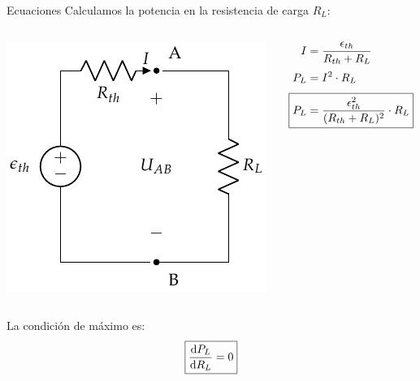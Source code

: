 \documentclass[aspectratio=169, xcolor={usenames,svgnames,dvipsnames}]{beamer}
\begin{document}
\begin{frame}{Ecuaciones}
    \vspace{2mm}
    Calculamos la \alert{potencia en la resistencia} de carga \(R_L\):
    \begin{columns}
    \begin{column}{0.45\columnwidth}
    \begin{center}
    \includegraphics[height=0.52\textheight]{../figs/EquivalenteThevenin0_R.pdf}
    \end{center}
    \end{column}
    
    \begin{column}{0.45\columnwidth}
    \begin{align*}
    I &= \frac{\epsilon_{th}}{R_{th} + R_L}\\[3pt]
    P_L &= I^2 \cdot R_L\\[3pt]
    \Aboxed{P_L &= \frac{\epsilon^2_{th}}{(R_{th} + R_L)^2} \cdot R_L}
    \end{align*}
    \end{column}
    \end{columns}

    \vspace{5mm}
    La \alert{condición de máximo} es:
    \[
      \boxed{%
        \diff{P_L}{R_L} = 0%
      }
    \]
\end{frame}

\end{document}
